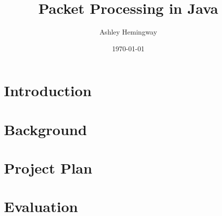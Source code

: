 \documentclass[a4paper, titlepage]{article}
\title{Packet Processing in Java}
\author{Ashley Hemingway}
\date{\today}
\begin{document}
\maketitle


\listoftodos

\newpage

\tableofcontents

\section{Introduction}

\section{Background}

\section{Project Plan}

\section{Evaluation}

\begin{thebibliography}{99}
\end{thebibliography}
\end{document}
